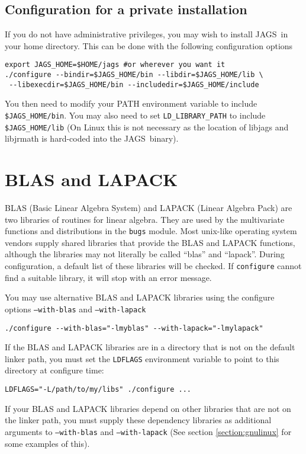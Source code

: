 \documentclass[11pt, a4paper, titlepage]{report}
\newcommand{\JAGS}{\textsf{JAGS}}
\begin{document}
\subsection{Configuration for a private installation}

If you do not have administrative privileges, you may wish to install
\JAGS\ in your home directory. This can be done with the following
configuration options
\begin{verbatim}
export JAGS_HOME=$HOME/jags #or wherever you want it
./configure --bindir=$JAGS_HOME/bin --libdir=$JAGS_HOME/lib \
 --libexecdir=$JAGS_HOME/bin --includedir=$JAGS_HOME/include
\end{verbatim}
You then need to modify your PATH environment variable to include
\verb+$JAGS_HOME/bin+. You may also need to set \verb+LD_LIBRARY_PATH+
to include \verb+$JAGS_HOME/lib+ (On Linux this is not necessary as
the location of libjags and libjrmath is hard-coded into the
\JAGS\ binary).

\section{BLAS and LAPACK}
\label{section:blas:lapack}

BLAS (Basic Linear Algebra System) and LAPACK (Linear Algebra Pack)
are two libraries of routines for linear algebra. They are used by the
multivariate functions and distributions in the \texttt{bugs} module.
Most unix-like operating system vendors supply shared libraries that
provide the BLAS and LAPACK functions, although the libraries may not
literally be called ``blas'' and ``lapack''.  During configuration, a
default list of these libraries will be checked. If \texttt{configure}
cannot find a suitable library, it will stop with an error message.

You may use alternative BLAS and LAPACK libraries using the configure
options \texttt{--with-blas} and \texttt{--with-lapack}
\begin{verbatim}
./configure --with-blas="-lmyblas" --with-lapack="-lmylapack"
\end{verbatim}

If the BLAS and LAPACK libraries are in a directory that is not on the
default linker path, you must set the \verb+LDFLAGS+ environment variable
to point to this directory at configure time:
\begin{verbatim}
LDFLAGS="-L/path/to/my/libs" ./configure ...
\end{verbatim}
If your BLAS and LAPACK libraries depend on other libraries that are
not on the linker path, you must supply these dependency libraries as
additional arguments to \texttt{--with-blas} and
\texttt{--with-lapack} (See section \ref{section:gnulinux} for some
examples of this).
\end{document}

